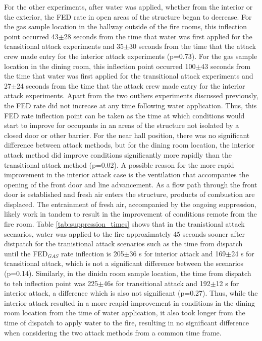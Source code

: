 \documentclass[12pt,oneside]{article}
\begin{document}
For the other experiments, after water was applied, whether from the interior or the exterior, the FED rate in open areas of the structure began to decrease. For the gas sample location in the hallway outside of the fire rooms, this inflection point occurred 43$\pm$28 seconds from the time that water was first applied for the transitional attack experiments and 35$\pm$30 seconds from the time that the attack crew made entry for the interior attack experiments (p=0.73). For the gas sample location in the dining room, this inflection point occurred 100$\pm$43 seconds from the time that water was first applied for the transitional attack experiments and 27$\pm$24 seconds from the time that the attack crew made entry for the interior attack experiments. Apart from the two outliers experiments discussed previously, the FED rate did not increase at any time following water application. Thus, this FED rate inflection point can be taken as the time at which conditions would start to improve for occupants in an areas of the structure not isolated by a closed door or other barrier. For the near hall position, there was no significant difference between attack methods, but for the dining room location, the interior attack method did improve conditions significantly more rapidly than the transitional attack method (p=0.02). A possible reason for the more rapid improvement in the interior attack case is the ventilation that accompanies the opening of the front door and line advancement. As a flow path through the front door is established and fresh air enters the structure, products of combustion are displaced. The entrainment of fresh air, accompanied by the ongoing suppression, likely work in tandem to result in the improvement of conditions remote from the fire room. Table \ref{tab:suppression_times} shows that in the tranistional attack scenarios, water was applied to the fire approximately 45 seconds sooner after distpatch for the tranistional attack scenarios such as the time from dispatch until the FED$_{GAS}$ rate inflection is 205$\pm$36 s for interior attack and 169$\pm$24 s for transitional attack, which is not a significant difference between the scenarios (p=0.14). Similarly, in the dinidn room sample location, the time from dispatch to teh inflection point was 225$\pm$46s for transitional attack and 192$\pm$12 s for interior attack, a difference which is also not significant (p=0.27). Thus, while the interior attack resulted in a more reapid improvement in conditions in the dining room location from the time of water application, it also took longer from the time of dispatch to apply water to the fire, resulting in no significant difference when considering the two attack methods from a common time frame. 
\end{document}
